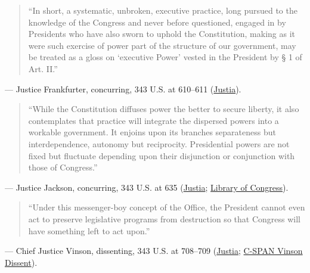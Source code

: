 \documentclass[12pt]{article}
\begin{document}
\begin{quote}
``In short, a systematic, unbroken, executive practice, long pursued to the knowledge of the Congress and never before questioned, engaged in by Presidents who have also sworn to uphold the Constitution, making as it were such exercise of power part of the structure of our government, may be treated as a gloss on `executive Power' vested in the President by \S{} 1 of Art. II.''
\end{quote}
\noindent --- Justice Frankfurter, concurring, 343 U.S. at 610--611 (\href{https://supreme.justia.com/cases/federal/us/343/579/}{Justia}).

\begin{quote}
``While the Constitution diffuses power the better to secure liberty, it also contemplates that practice will integrate the dispersed powers into a workable government. It enjoins upon its branches separateness but interdependence, autonomy but reciprocity. Presidential powers are not fixed but fluctuate depending upon their disjunction or conjunction with those of Congress.''
\end{quote}
\noindent --- Justice Jackson, concurring, 343 U.S. at 635 (\href{https://supreme.justia.com/cases/federal/us/343/579/}{Justia}; \href{https://tile.loc.gov/storage-services/service/ll/usrep/usrep343/usrep343579/usrep343579.pdf}{Library of Congress}).

\begin{quote}
``Under this messenger-boy concept of the Office, the President cannot even act to preserve legislative programs from destruction so that Congress will have something left to act upon.''
\end{quote}
\noindent --- Chief Justice Vinson, dissenting, 343 U.S. at 708--709 (\href{https://supreme.justia.com/cases/federal/us/343/579/}{Justia}; \href{https://static.c-span.org/landmarkCases/pdf/Youngstown_Vinson_Dissent.pdf}{C-SPAN Vinson Dissent}).
\end{document}
